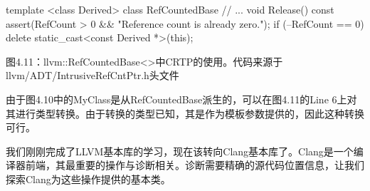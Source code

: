 \begin{cpp}
template <class Derived> class RefCountedBase {
  // ...
  void Release() const {
    assert(RefCount > 0 && "Reference count is already zero.");
    if (--RefCount == 0)
      delete static_cast<const Derived *>(this);
  }
}
\end{cpp}

\begin{center}
图4.11：llvm::RefCountedBase<>中CRTP的使用。代码来源于llvm/ADT/IntrusiveRefCntPtr.h头文件
\end{center}

由于图4.10中的MyClass是从RefCountedBase派生的，可以在图4.11的Line 6上对其进行类型转换。由于转换的类型已知，其是作为模板参数提供的，因此这种转换可行。

我们刚刚完成了LLVM基本库的学习，现在该转向Clang基本库了。Clang是一个编译器前端，其最重要的操作与诊断相关。诊断需要精确的源代码位置信息，让我们探索Clang为这些操作提供的基本类。


















































































